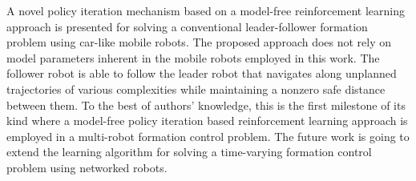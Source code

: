 \documentclass[conference]{IEEEtran}
\begin{document}
A novel policy iteration mechanism based on a model-free reinforcement learning approach is presented for solving a conventional leader-follower formation problem using car-like mobile robots. The proposed approach does not rely on model parameters inherent in the mobile robots employed in this work. The follower robot is able to follow the leader robot that navigates along unplanned trajectories of various complexities while maintaining a nonzero safe distance between them. To the best of authors' knowledge, this is the first milestone of its kind where a model-free policy iteration based reinforcement learning approach is employed in a multi-robot formation control problem. The future work is going  to extend the learning algorithm for solving a time-varying formation control problem using networked robots.







\end{document}
